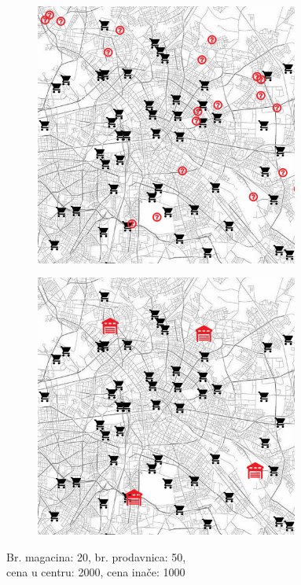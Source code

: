 \documentclass[a4paper]{article}
\begin{document}
\begin{figure}[H]
\centering
\begin{subfigure}{.5\textwidth}
    \centering
    \includegraphics[width=0.95\textwidth]{pics/candidates1.png}
\end{subfigure}%
\begin{subfigure}{.5\textwidth}
    \centering
    \includegraphics[width=0.95\textwidth]{pics/final1.png}
\end{subfigure}
\caption[long]{Br. magacina: 20, br. prodavnica: 50,\\ cena u centru: 2000, cena inače: 1000}
\label{fig:sl1}
\end{figure}
\end{document}
